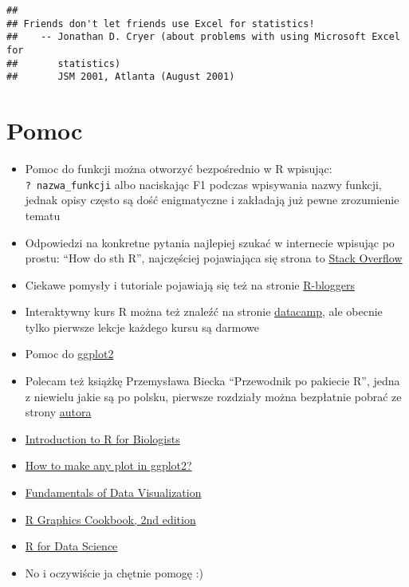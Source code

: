 \documentclass[
]{book}
\providecommand{\tightlist}{%
  \setlength{\itemsep}{0pt}\setlength{\parskip}{0pt}}
\begin{document}
\begin{verbatim}
## 
## Friends don't let friends use Excel for statistics!
##    -- Jonathan D. Cryer (about problems with using Microsoft Excel for
##       statistics)
##       JSM 2001, Atlanta (August 2001)
\end{verbatim}

\hypertarget{pomoc}{%
\section{Pomoc}\label{pomoc}}

\begin{itemize}
\tightlist
\item
  Pomoc do funkcji można otworzyć bezpośrednio w R wpisując: \texttt{?\ nazwa\_funkcji} albo naciskając F1 podczas wpisywania nazwy funkcji, jednak opisy często są dość enigmatyczne i zakładają już pewne zrozumienie tematu
\item
  Odpowiedzi na konkretne pytania najlepiej szukać w internecie wpisując po prostu: ``How do sth R'', najczęściej pojawiająca się strona to \href{http://stackoverflow.com/}{Stack Overflow}
\item
  Ciekawe pomysły i tutoriale pojawiają się też na stronie \href{http://www.r-bloggers.com/}{R-bloggers}
\item
  Interaktywny kurs R można też znaleźć na stronie \href{https://www.datacamp.com}{datacamp}, ale obecnie tylko pierwsze lekcje każdego kursu są darmowe
\item
  Pomoc do \href{http://docs.ggplot2.org/current/}{ggplot2}
\item
  Polecam też książkę Przemysława Biecka ``Przewodnik po pakiecie R'', jedna z niewielu jakie są po polsku, pierwsze rozdziały można bezpłatnie pobrać ze strony \href{http://www.biecek.pl/}{autora}
\item
  \href{https://melbournebioinformatics.github.io/r-intro-biologists/intro_r_biologists.html\#R_for_Biologists_course}{Introduction to R for Biologists}
\item
  \href{http://r-statistics.co/ggplot2-Tutorial-With-R.html}{How to make any plot in ggplot2?}
\item
  \href{https://clauswilke.com/dataviz/index.html}{Fundamentals of Data Visualization}
\item
  \href{https://r-graphics.org/index.html}{R Graphics Cookbook, 2nd edition}
\item
  \href{https://r4ds.had.co.nz/index.html}{R for Data Science}
\item
  No i oczywiście ja chętnie pomogę :)
\end{itemize}
\end{document}
